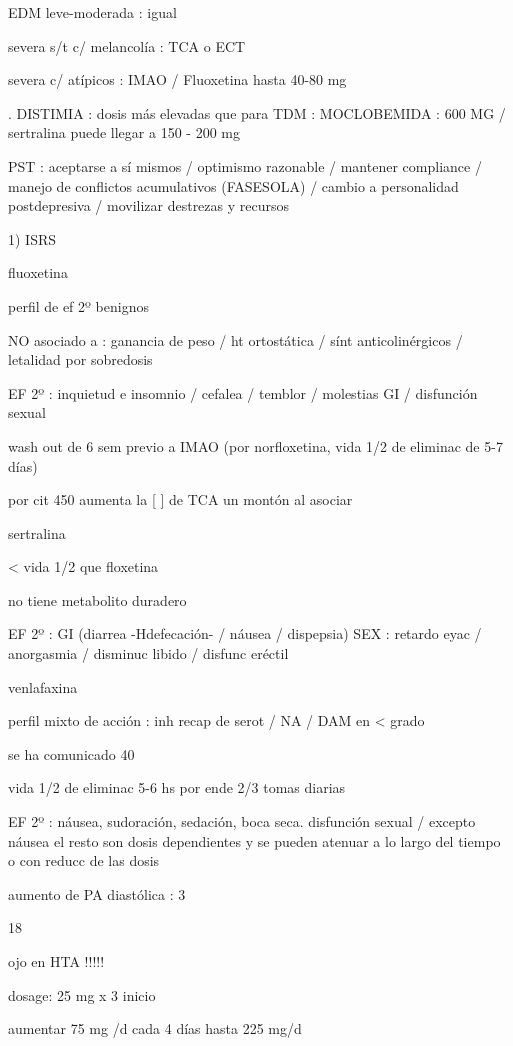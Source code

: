 EDM leve-moderada : igual

severa s/t c/ melancolía : TCA o ECT

severa c/ atípicos : IMAO / Fluoxetina hasta 40-80 mg

. DISTIMIA : dosis más elevadas que para TDM : MOCLOBEMIDA : 600 MG / sertralina puede llegar a 150 - 200 mg

PST : aceptarse a sí mismos / optimismo razonable / mantener compliance / manejo de conflictos acumulativos (FASESOLA) / cambio a personalidad postdepresiva / movilizar destrezas y recursos

1) ISRS

fluoxetina

perfil de ef 2º benignos

NO asociado a : ganancia de peso / ht ortostática / sínt anticolinérgicos / letalidad por sobredosis

EF 2º : inquietud e insomnio / cefalea / temblor / molestias GI / disfunción sexual

wash out de 6 sem previo a IMAO (por norfloxetina, vida 1/2 de eliminac de 5-7 días)

por cit 450 aumenta la [ ] de TCA un montón al asociar

sertralina

< vida 1/2 que floxetina

no tiene metabolito duradero

EF 2º : GI (diarrea -Hdefecación- / náusea / dispepsia) SEX : retardo eyac / anorgasmia / disminuc libido / disfunc eréctil

venlafaxina

perfil mixto de acción : inh recap de serot / NA / DAM en < grado

se ha comunicado 40 %

vida 1/2 de eliminac 5-6 hs por ende 2/3 tomas diarias

EF 2º : náusea, sudoración, sedación, boca seca. disfunción sexual / excepto náusea el resto son dosis dependientes y se pueden atenuar a lo largo del tiempo o con reducc de las dosis

aumento de PA diastólica : 3%

18 %

ojo en HTA !!!!!

dosage: 25 mg x 3 inicio

aumentar 75 mg /d cada 4 días hasta 225 mg/d

